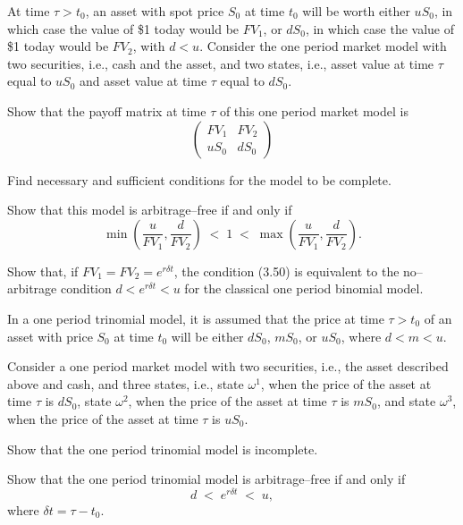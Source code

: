 \begin{exercises}
\item At time $\tau > t_0$, an asset with spot price $S_0$ at time $t_0$
will be worth either $uS_0$, in which case the value of \$1 today would be
$FV_1$, or $dS_0$, in which case the value of \$1 today would be $FV_2$,
with $d < u$. Consider the one period market model with two securities,
i.e., cash and the asset, and two states, i.e., asset value at time $\tau$
equal to $uS_0$ and asset value at time $\tau$ equal to $dS_0$.
\begin{subparts}
\item Show that the payoff matrix at time $\tau$ of this one period market
model is
\[
\begin{pmatrix} FV_1 & FV_2\\ uS_0 & dS_0\end{pmatrix}
\]
\item Find necessary and sufficient conditions for the model to be
complete.
\item Show that this model is arbitrage--free if and only if
\begin{equation}
\min\left(\frac{u}{FV_1}, \frac{d}{FV_2}\right) \;<\; 1 \;<\;
\max\left(\frac{u}{FV_1}, \frac{d}{FV_2}\right).
\end{equation}
\item Show that, if $FV_1 = FV_2 = e^{r\delta t}$, the condition (3.50) is
equivalent to the no--arbitrage condition $d < e^{r\delta t} < u$ for the
classical one period binomial model.
\end{subparts}

\item In a one period trinomial model, it is assumed that the price at
time $\tau > t_0$ of an asset with price $S_0$ at time $t_0$ will be
either $dS_0$, $mS_0$, or $uS_0$, where $d < m < u$.

Consider a one period market model with two securities, i.e., the asset
described above and cash, and three states, i.e., state $\omega^1$, when
the price of the asset at time $\tau$ is $dS_0$, state $\omega^2$, when the
price of the asset at time $\tau$ is $mS_0$, and state $\omega^3$, when the
price of the asset at time $\tau$ is $uS_0$.
\begin{subparts}
\item Show that the one period trinomial model is incomplete.
\item Show that the one period trinomial model is arbitrage--free if and
only if
\[
d \;<\; e^{r\delta t} \;<\; u,
\]
where $\delta t = \tau - t_0$.
\end{subparts}


\end{exercises}
